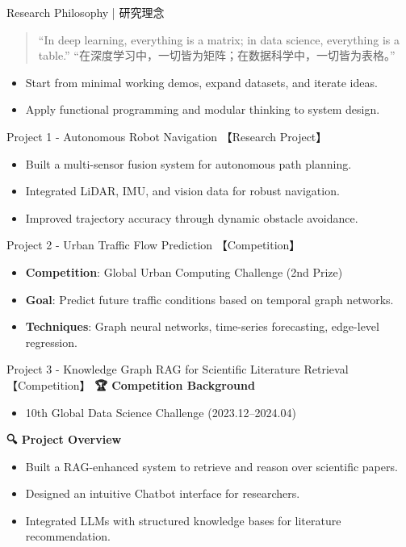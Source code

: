 \documentclass[11pt]{beamer}
\begin{document}
\begin{frame}{Research Philosophy | 研究理念}
\begin{quote}
  “In deep learning, everything is a matrix; in data science, everything is a table.”
  \newline
  “在深度学习中，一切皆为矩阵；在数据科学中，一切皆为表格。”
\end{quote}
\begin{itemize}
  \item Start from minimal working demos, expand datasets, and iterate ideas.
  \item Apply functional programming and modular thinking to system design.
\end{itemize}
\end{frame}

\begin{frame}{Project 1 - Autonomous Robot Navigation 【Research Project】}
\begin{itemize}
  \item Built a multi-sensor fusion system for autonomous path planning.
  \item Integrated LiDAR, IMU, and vision data for robust navigation.
  \item Improved trajectory accuracy through dynamic obstacle avoidance.
\end{itemize}
\end{frame}

\begin{frame}{Project 2 - Urban Traffic Flow Prediction 【Competition】}
\begin{itemize}
  \item \textbf{Competition}: Global Urban Computing Challenge (2nd Prize)
  \item \textbf{Goal}: Predict future traffic conditions based on temporal graph networks.
  \item \textbf{Techniques}: Graph neural networks, time-series forecasting, edge-level regression.
\end{itemize}
\end{frame}




\begin{frame}{Project 3 - Knowledge Graph RAG for Scientific Literature Retrieval 【Competition】}
\textbf{🏆 Competition Background}
\begin{itemize}
  \item 10th Global Data Science Challenge (2023.12–2024.04)
\end{itemize}
\textbf{🔍 Project Overview}
\begin{itemize}
  \item Built a RAG-enhanced system to retrieve and reason over scientific papers.
  \item Designed an intuitive Chatbot interface for researchers.
  \item Integrated LLMs with structured knowledge bases for literature recommendation.
\end{itemize}
\end{frame}
\end{document}
